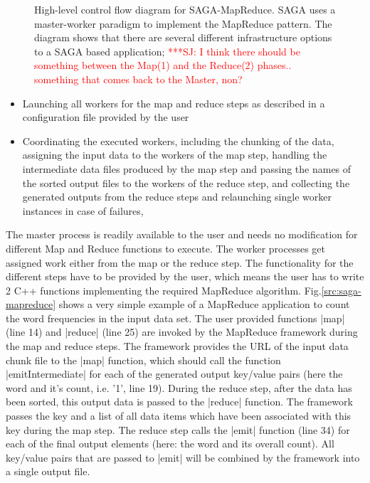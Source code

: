 \documentclass[conference,final]{IEEEtran}
\newcommand{\jhanote}[1]{ {\textcolor{red} { ***SJ: #1 }}}
\newcommand{\jhanote}[1]{}
\newcommand{\upp}{\vspace*{-0.5em}}
\begin{document}
\begin{figure}[t]
\upp
\centering
\caption{High-level control flow diagram for SAGA-MapReduce. SAGA uses
  a master-worker paradigm to implement the MapReduce pattern. The
  diagram shows that there are several different infrastructure
  options to a SAGA based
  application; %
  \jhanote{I think there should be something between the Map(1) and
    the Reduce(2) phases.. something that comes back to the Master,
    non?}} \vspace{-2em}
      \label{saga-mapreduce_controlflow}
\end{figure}

\begin{itemize}
\item Launching all workers for the map and reduce steps as described
  in a configuration file provided by the user 
\item Coordinating the executed workers, including the chunking of the
  data, assigning the input data to the workers of the map step,
  handling the intermediate data files produced by the map step and
  passing the names of the sorted output files to the workers of the
  reduce step, and collecting the generated outputs from the reduce
  steps and relaunching single worker instances in case of failures,
\end{itemize}

The master process is readily available to the user and needs no
modification for different Map and Reduce functions to execute.  The
worker processes get assigned work either from the map or the reduce
step. The functionality for the different steps have to be provided by
the user, which means the user has to write 2 C++ functions
implementing the required MapReduce algorithm.
Fig.\ref{src:saga-mapreduce} shows a very simple example of a
MapReduce application to count the word frequencies in the input data
set. The user provided functions |map| (line 14) and |reduce| (line
25) are invoked by the MapReduce framework during the map and reduce
steps. The framework provides the URL of the input data chunk file to
the |map| function, which should call the function |emitIntermediate|
for each of the generated output key/value pairs (here the word and
it's count, i.e. '1', line 19). During the reduce step, after the data
has been sorted, this output data is passed to the |reduce|
function. The framework passes the key and a list of all data items
which have been associated with this key during the map step. The
reduce step calls the |emit| function (line 34) for each of the final
output elements (here: the word and its overall count). All key/value
pairs that are passed to |emit| will be combined by the framework into
a single output file.
\end{document}
